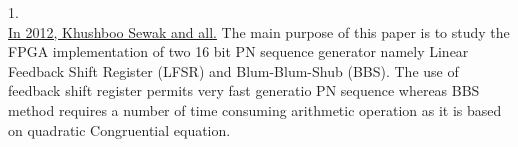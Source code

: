 1.\\
\underline{In 2012, Khushboo Sewak and all.} The main purpose of this paper is to study the FPGA implementation of two 16 bit PN sequence generator namely Linear Feedback Shift Register (LFSR) and Blum-Blum-Shub (BBS). The use of feedback shift register permits very fast generatio PN sequence whereas BBS method requires a number of time consuming arithmetic operation as it is based on quadratic Congruential equation.